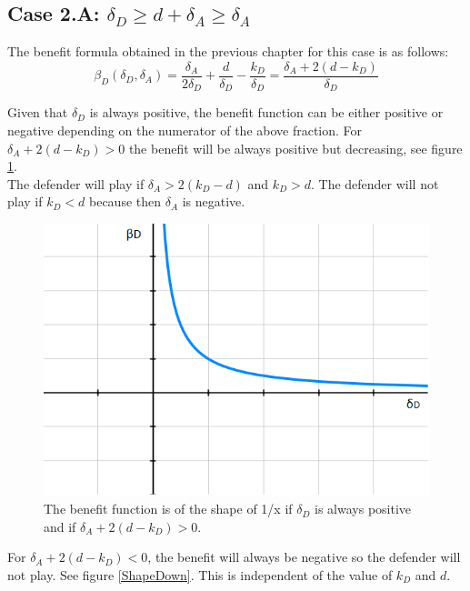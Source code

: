 \subsection*{Case 2.A: $\delta_{D} \geq d+\delta_{A} \geq \delta_{A} $ }

The benefit formula obtained in the previous chapter for this case is as follows:
\begin{equation*}
\beta_{D}(\delta_{D},\delta_{A})= \dfrac{\delta_{A}}{2\delta_{D}} + \dfrac{d}{\delta_{D}} - \dfrac{k_{D}}{\delta_{D}} = \dfrac{\delta_{A} + 2 (d-k_{D})}{\delta_{D}}
\end{equation*}

Given that $\delta_{D}$ is always positive, the benefit function can be either positive or negative depending on the numerator of the above fraction. For $\delta_{A} + 2(d-k_{D}) > 0$ the benefit will be always positive but decreasing, see figure \ref{ShapeUp}. \\
The defender will play if $ \delta_{A} > 2(k_{D} -d)$ and $k_{D} > d$. The defender will not play if $k_{D} < d$ because then $ \delta_{A}$ is negative.\\
\begin{figure}
\centering
\includegraphics[scale=0.5]{Images/ShapesUp.png} 
\caption{The benefit function is of the shape of 1/x if $\delta_{D}$ is always positive and if $\delta_{A} + 2(d-k_{D}) > 0$. }
\label{ShapeUp}
\end{figure}

For $\delta_{A} + 2(d-k_{D}) < 0$, the benefit will always be negative so the defender will not play. See figure \ref{ShapeDown}. This is independent of the value of $k_{D}$ and $ d$. 

